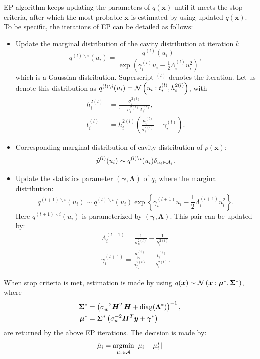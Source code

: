 \documentclass{article}
\DeclarePairedDelimiter{\diagfences}{(}{)}
\newcommand{\diag}{\operatorname{diag}\diagfences}
\begin{document}
EP algorithm keeps updating the parameters of $q(\bm{x})$ until it meets the stop criteria, after which the most probable $\bm{x}$ is estimated by using updated $q(\bm{x})$. To be specific, the iterations of EP can be detailed as follows:
\begin{itemize}
\item Update the marginal distribution of the cavity distribution at iteration $l$:
  \begin{equation}
    q^{(l)\backslash i}(u_i) = \frac{q^{(l)}(u_i)}{\exp\left( \gamma_i^{(l)}u_i - \frac{1}{2}\Lambda_i^{(l)}u_i^2 \right)} ,
  \end{equation}
  which is a Gaussian distribution. Superscript $^{(l)}$ denotes the iteration. Let us denote this distribution as $q^{(l)\backslash i}(u_i) = \mathcal{N}\left( u_i: t_i^{(l)}, h_i^{2(l)} \right)$, with
  \begin{align}
    h_i^{2 (l)} &= \frac{\sigma_i^{2 (l)}}{1-\sigma_i^{2 (l)} \Lambda_i^{(l)}}, \\
    t_i^{(l)} &= h_i^{2(l)}\left( \frac{\mu_i^{(l)}}{\sigma_i^{2(l)}} - {\gamma_i^{(l)}} \right).
  \end{align}
  

\item Corresponding marginal distribution of cavity distribution of $p(\bm{x})$:
  \begin{equation}
    \hat{p}^{(l)}(u_i) \sim q^{(l)\backslash i}(u_i)\delta_{u_i \in \mathcal{A}_i}.
  \end{equation}
\item Update the statistics parameter $\left( \bm{\gamma}, \bm{\Lambda} \right)$ of $q$, where the marginal distribution:
  \begin{equation}
    q^{(l+1)\backslash i}(u_i) \sim q^{(l)\backslash i}(u_i) \exp\left\{ \gamma_i^{(l+1)}u_i - \frac{1}{2}\Lambda_i^{(l+1)}u_i^2 \right\}.
  \end{equation}
  Here $q^{(t+1)\backslash i}(u_i)$ is parameterized by $\left(\bm{\gamma}, \bm{\Lambda}\right)$. This pair can be updated by:
  \begin{align}
    \Lambda_i^{(l+1)} = \frac{1}{\sigma_{p_i}^{2(l)}} - \frac{1}{h_i^{2(l)}} \\
    \gamma_i^{(l+1)} = \frac{\mu_{p_i}^{(t)}}{\sigma_{p_i}^{2(t)}} - \frac{t_i^{(t)}}{h_i^{2(t)}}.
  \end{align}
  
\end{itemize}

When stop criteria is met, estimation is made by using $q(\bm{x}) \sim \mathcal{N}\left(\bm{x}:\bm{\mu}^{\ast}, \bm{\Sigma}^{\ast} \right)$, where
\begin{align}
  \bm{\Sigma}^{\ast} &= \left( \sigma_{w}^{-2}\bm{H}^{T}\bm{H} +  \diag{\bm{\Lambda}^{\ast}} \right)^{-1}, \\
  \bm{\mu}^{\ast} & = \bm{\Sigma}^{\ast}\left( \sigma_{w}^{-2}\bm{H}^{T}\bm{y} +  \bm{\gamma}^{\ast} \right)
\end{align}
are returned by the above EP iterations. The decision is made by:
\begin{equation}
  \hat{\mu}_{i} = \underset{\mu_i \in \mathcal{A}}{\operatorname{argmin}}\; | \mu_i - \mu_i^{\ast} |
\end{equation}
\end{document}
